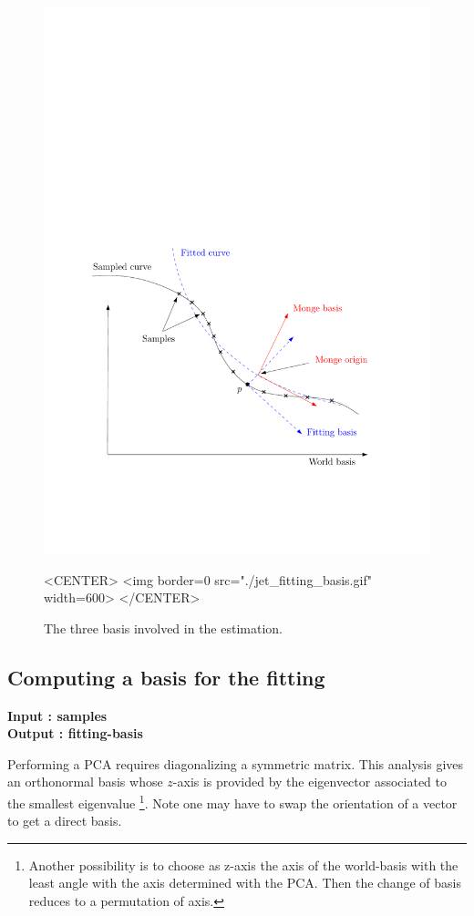 \begin{figure}[h!]
\begin{ccTexOnly}
\centerline{
\includegraphics[width=.5\linewidth]{Jet_fitting_3/jet_fitting_basis}}
\end{ccTexOnly}

\label{fig:jet_fitting_basis}
\caption{The three basis involved in the estimation.}

\begin{ccHtmlOnly}
<CENTER>
<img border=0 src="./jet_fitting_basis.gif" width=600>
</CENTER>
\end{ccHtmlOnly}
\end{figure}

\subsection{Computing a basis for the fitting}

{\bf Input : samples\\ Output : fitting-basis}


%
%
Performing a PCA requires diagonalizing a symmetric matrix.  This
analysis gives an orthonormal basis whose $z$-axis is provided by the
eigenvector associated to the smallest eigenvalue
\footnote{Another possibility is to choose as z-axis the axis of the
world-basis with the least angle with the axis determined with the
PCA. Then the change of basis reduces to a permutation of axis.}. Note
one may have to swap the orientation of a vector to get a direct
basis.

